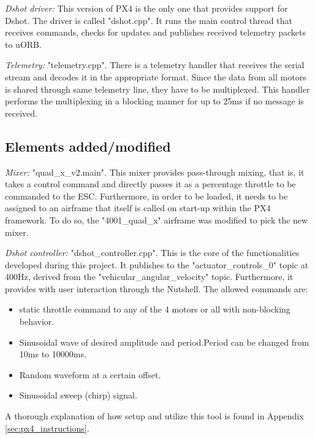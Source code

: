 \textit{Dshot driver: } This version of PX4 is the only one that provides support for Dshot. The driver is called "dshot.cpp". It runs the main control thread that receives commands, checks for updates and publishes received telemetry packets to uORB.
\newline

\textit{Telemetry: } "telemetry.cpp". There is a telemetry handler that receives the serial stream and decodes it in the appropriate format. Since the data from all motors is shared through same telemetry line, they have to be multiplexed. This handler performs the multiplexing in a blocking manner for up to 25ms if no message is received.
\newline

\subsection{Elements added/modified}
\textit{Mixer: } "quad\_x\_v2.main". This mixer provides pass-through mixing, that is, it takes a control command and directly passes it as a percentage throttle to be commanded to the ESC. Furthermore, in order to be loaded, it needs to be assigned to an airframe that itself is called on start-up within the PX4 framework. To do so, the "4001\_quad\_x" airframe was modified to pick the new mixer.
\newline

\textit{Dshot controller: } "dshot\_controller.cpp". This is the core of the functionalities developed during this project.  It publishes to the "actuator\_controls\_0" topic at 400Hz, derived from the "vehicular\_angular\_velocity" topic. Furthermore, it provides with user interaction through the Nutshell. The allowed commands are:
\begin{itemize}
	\item static throttle command to any of the 4 motors or all with non-blocking behavior.
	\item Sinusoidal wave of desired amplitude and period.Period can be changed from 10ms to 10000ms.
	\item Random waveform at a certain offset.
	\item Sinusoidal sweep (chirp) signal.
\end{itemize}
A thorough explanation of how setup and utilize this tool is found in Appendix \ref{sec:px4_instructions}.